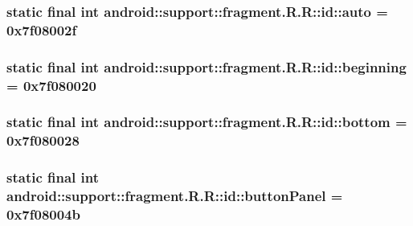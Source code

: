 \hypertarget{classandroid_1_1support_1_1fragment_1_1_r_1_1id_3dbbbf4cb83671c4c74eaae0de6e4484}{
\subsubsection[{auto}]{\setlength{\rightskip}{0pt plus 5cm}static final int android::support::fragment.R.R::id::auto = 0x7f08002f}}
\label{classandroid_1_1support_1_1fragment_1_1_r_1_1id_3dbbbf4cb83671c4c74eaae0de6e4484}


\hypertarget{classandroid_1_1support_1_1fragment_1_1_r_1_1id_2a542150d7d2e1460239a3f7c62f4ec3}{
\subsubsection[{beginning}]{\setlength{\rightskip}{0pt plus 5cm}static final int android::support::fragment.R.R::id::beginning = 0x7f080020}}
\label{classandroid_1_1support_1_1fragment_1_1_r_1_1id_2a542150d7d2e1460239a3f7c62f4ec3}


\hypertarget{classandroid_1_1support_1_1fragment_1_1_r_1_1id_ad1aa73593a5355d59ed918736765dbc}{
\subsubsection[{bottom}]{\setlength{\rightskip}{0pt plus 5cm}static final int android::support::fragment.R.R::id::bottom = 0x7f080028}}
\label{classandroid_1_1support_1_1fragment_1_1_r_1_1id_ad1aa73593a5355d59ed918736765dbc}


\hypertarget{classandroid_1_1support_1_1fragment_1_1_r_1_1id_3d9fd634f07687ccd38782f5aaf095d6}{
\subsubsection[{buttonPanel}]{\setlength{\rightskip}{0pt plus 5cm}static final int android::support::fragment.R.R::id::buttonPanel = 0x7f08004b}}
\label{classandroid_1_1support_1_1fragment_1_1_r_1_1id_3d9fd634f07687ccd38782f5aaf095d6}


